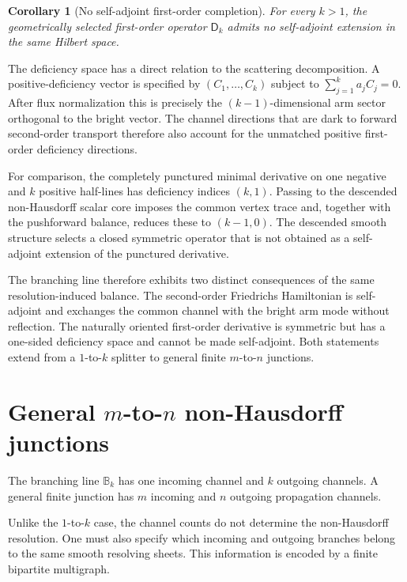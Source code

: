 \documentclass[11pt]{article}
\theoremstyle{plain}
\newtheorem{corollary}[theorem]{Corollary}
\theoremstyle{definition}
\begin{document}
\begin{corollary}[No self-adjoint first-order completion]
\label{cor:Bk-no-SA}
For every \(k>1\), the geometrically selected first-order operator
\(\mathsf D_k\) admits no self-adjoint extension in the same Hilbert space.
\end{corollary}

The deficiency space has a direct relation to the scattering decomposition.
A positive-deficiency vector is specified by \((C_1,\ldots,C_k)\) subject to
\(\sum_{j=1}^{k}a_jC_j=0\).
After flux normalization this is precisely the \((k-1)\)-dimensional arm
sector orthogonal to the bright vector. The channel directions that are dark
to forward second-order transport therefore also account for the unmatched
positive first-order deficiency directions.

For comparison, the completely punctured minimal derivative on one negative
and \(k\) positive half-lines has deficiency indices
\((k,1)\).
Passing to the descended non-Hausdorff scalar core imposes the common vertex
trace and, together with the pushforward balance, reduces these to
\((k-1,0)\).
The descended smooth structure selects a closed symmetric operator that
is not obtained as a self-adjoint extension of the punctured derivative.

The branching line therefore exhibits two distinct consequences of the same
resolution-induced balance. The second-order Friedrichs Hamiltonian is
self-adjoint and exchanges the common channel with the bright arm mode
without reflection. The naturally oriented first-order derivative is
symmetric but has a one-sided deficiency space and cannot be made
self-adjoint. Both statements extend from a \(1\)-to-\(k\) splitter to
general finite \(m\)-to-\(n\) junctions.
\section{\texorpdfstring{General \(m\)-to-\(n\) non-Hausdorff junctions}{General m-to-n non-Hausdorff junctions}}
\label{sec:Bmn}

The branching line \(\mathbb B_k\) has one incoming channel and \(k\)
outgoing channels. A general finite junction has \(m\) incoming and \(n\) outgoing propagation channels.

Unlike the \(1\)-to-\(k\) case, the channel counts do not determine the
non-Hausdorff resolution. One must also specify which incoming and outgoing
branches belong to the same smooth resolving sheets. This information is
encoded by a finite bipartite multigraph.
\end{document}

